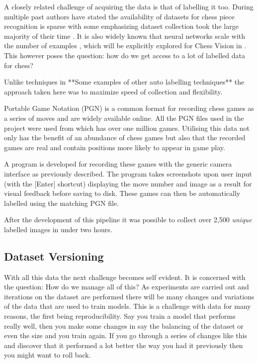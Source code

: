 A closely related challenge of acquiring the data is that of labelling it too. 
During  multiple past authors have stated the availability of 
datasets for chess piece recognition is sparse \cite{} with some emphasizing
dataset collection took the large majority of their time \cite{}.
It is also widely known that neural networks scale with the number of examples \cite{}, 
which will be explicitly explored for Chess Vision in .
This however poses the question: how do we get access to a lot of labelled data 
for chess?

Unlike techniques in \cite{}  **Some examples of other auto labelling techniques**
the approach taken here was to maximize speed of collection and flexibility.

Portable Game Notation (PGN) is a common format for recording chess games as a 
series of moves and are widely available online.  All the PGN files used in the 
project were used from \cite{} which has over one million games.  Utilising this
data not only has the benefit of an abundance of chess games but also that the 
recorded games are real and contain positions more likely to appear in game play. 

A program is developed for recording these games with the generic camera interface
as previously described.  The program takes screenshots upon user input (with the
[Enter] shortcut) displaying the move number and image as a result for visual feedback
before saving to disk.  These games can then be automatically labelled using the matching
PGN file.

After the development of this pipeline it was possible to collect over 2,500 \textit{unique} labelled
images in under two hours.

\subsection{Dataset Versioning}
With all this data the next challenge becomes self evident. It is concerned with the question: How do we manage all of this?
As experiments are carried out and iterations on the dataset are performed there will be many changes and variations of the data
that are used to train models.  This is a challenge with data for many reasons, the first being reproducibility.  Say you train a model
that performs really well, then you make some changes in say the balancing of the dataset or even the size and you train again.  If you go 
through a series of changes like this and discover that it performed a lot better the way you had it previously then you might want to roll back.

